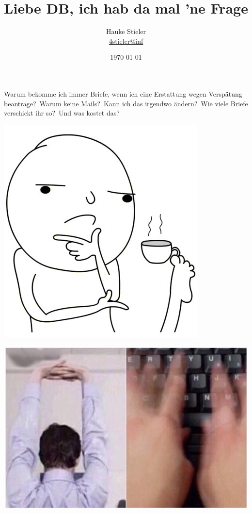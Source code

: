 \documentclass{beamer}
\author[Hauke Stieler]{Hauke Stieler\\\href{mailto:4stieler@informatik.uni-hamburg.de}{4stieler@inf}}
\title{Liebe DB, ich hab da mal 'ne Frage}
\date{\today}
\begin{document}
	\maketitle
	
	\begin{frame}[plain]
		\Large
		Warum bekomme ich immer Briefe, wenn ich eine Erstattung wegen Verspätung beantrage?\pause\ Warum keine Mails?\pause\ Kann ich das irgendwo ändern?\pause\ Wie viele Briefe verschickt ihr so?\pause\ Und was kostet das?\pause \\
		\vspace{0.5cm}
		\begin{center}
			\includegraphics[width=0.5\textheight]{images/thinking-meme}
		\end{center}
	\end{frame}
	
	\begin{frame}[plain]
		\begin{center}
			\includegraphics[width=\textheight]{images/typing-meme}
		\end{center}
	\end{frame}
\end{document}

